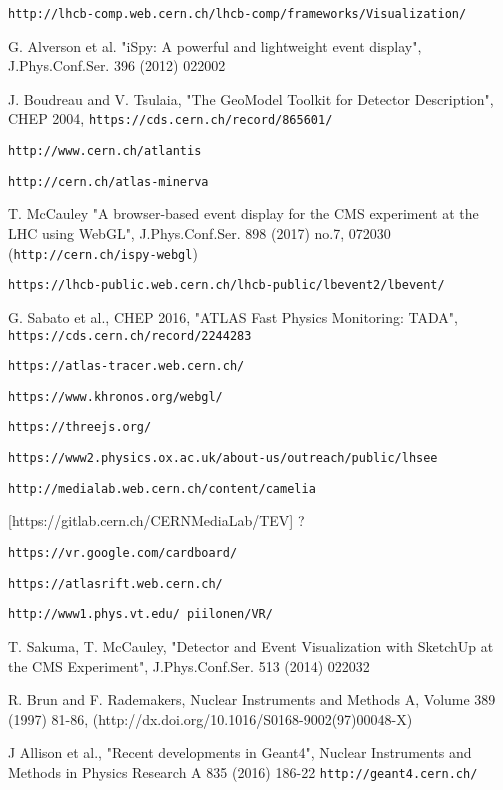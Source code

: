 \documentclass[12pt,a4paper]{article}
\begin{document}
\begin{thebibliography}{999}
 {\tt http://lhcb-comp.web.cern.ch/lhcb-comp/frameworks/Visualization/}

 G. Alverson et al. "iSpy: A powerful and lightweight event display", J.Phys.Conf.Ser. 396 (2012) 022002

 J. Boudreau and V. Tsulaia, "The GeoModel Toolkit for Detector Description", CHEP 2004, {\tt https://cds.cern.ch/record/865601/}

 {\tt http://www.cern.ch/atlantis}

 {\tt http://cern.ch/atlas-minerva}

 T. McCauley "A browser-based event display for the CMS experiment at the LHC using WebGL", J.Phys.Conf.Ser. 898 (2017) no.7, 072030
  ({\tt http://cern.ch/ispy-webgl})

 {\tt https://lhcb-public.web.cern.ch/lhcb-public/lbevent2/lbevent/}

 G. Sabato et al., CHEP 2016, "ATLAS Fast Physics Monitoring: TADA",  {\tt https://cds.cern.ch/record/2244283}

 {\tt https://atlas-tracer.web.cern.ch/}

 {\tt https://www.khronos.org/webgl/}

 {\tt https://threejs.org/}

 {\tt https://www2.physics.ox.ac.uk/about-us/outreach/public/lhsee}

 {\tt http://medialab.web.cern.ch/content/camelia}

 [https://gitlab.cern.ch/CERNMediaLab/TEV] ?

 {\tt https://vr.google.com/cardboard/}

 {\tt https://atlasrift.web.cern.ch/}

 {\tt http://www1.phys.vt.edu/~piilonen/VR/}

 T. Sakuma, T. McCauley, "Detector and Event Visualization with SketchUp at the CMS Experiment", J.Phys.Conf.Ser. 513 (2014) 022032

 R. Brun and F. Rademakers, Nuclear Instruments and Methods A, Volume 389 (1997) 81-86, (http://dx.doi.org/10.1016/S0168-9002(97)00048-X)

 J Allison et al., "Recent developments in Geant4", Nuclear Instruments and Methods in Physics Research A 835 (2016) 186-22
  {\tt http://geant4.cern.ch/}


\end{thebibliography}
\end{document}
